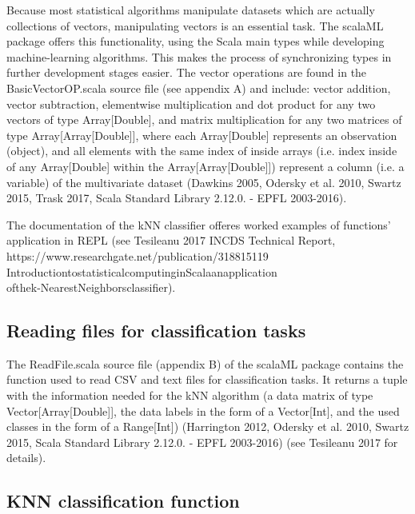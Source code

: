 \documentclass[journal]{IEEEtran}
\begin{document}
Because most statistical algorithms manipulate datasets which are actually collections of vectors, manipulating vectors is an essential task. The scalaML package offers this functionality, using the Scala main types while developing machine-learning algorithms. This makes the process of synchronizing types in further development stages easier.
 The vector operations are found in the BasicVectorOP.scala source file (see appendix A) and include: vector addition, vector subtraction, elementwise multiplication and dot product for any two vectors of type Array[Double], and matrix multiplication for any two matrices of type Array[Array[Double]], where each Array[Double] represents an observation (object), and all elements with the same index of inside arrays (i.e. index inside of any Array[Double] within the Array[Array[Double]]) represent a column (i.e. a variable) of the multivariate dataset (Dawkins 2005, Odersky et al. 2010, Swartz 2015, Trask 2017, Scala Standard Library 2.12.0. - EPFL 2003-2016).

The documentation of the kNN classifier offeres worked examples of functions' application in REPL (see Tesileanu 2017 INCDS Technical Report, https://www.researchgate.net/publication/318815119\underline{\space}\\Introduction\underline{\space}to\underline{\space}statistical\underline{\space}computing\underline{\space}in\underline{\space}Scala\underline{\space}an\underline{\space}application\underline{\space}\\of\underline{\space}the\underline{\space}k-Nearest\underline{\space}Neighbors\underline{\space}classifier).  

\subsection{Reading files for classification tasks}

The ReadFile.scala source file (appendix B) of the scalaML package contains the function used to read CSV and text files for classification tasks. It returns a tuple with the information needed for the kNN algorithm (a data matrix of type Vector[Array[Double]], the data labels in the form of a Vector[Int],  and the used classes in the form of a Range[Int]) (Harrington 2012, Odersky et al. 2010, Swartz 2015, Scala Standard Library 2.12.0. - EPFL 2003-2016) (see Tesileanu 2017 for details).
 
\subsection{KNN classification function}
\end{document}
